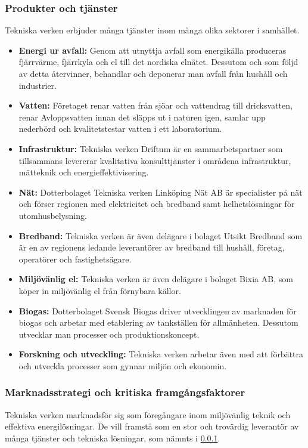 \documentclass[10pt,a4paper]{article}
\begin{document}
\subsubsection{Produkter och tjänster} \label{prod}
Tekniska verken erbjuder många tjänster inom många olika sektorer i samhället.
\begin{itemize}
	\item \textbf{Energi ur avfall:} Genom att utnyttja avfall som energikälla
	produceras fjärrvärme, fjärrkyla och el till det nordiska elnätet. Dessutom och
	som följd av detta återvinner, behandlar och deponerar man avfall från hushåll
	och industrier.
	\item \textbf{Vatten:} Företaget renar vatten från sjöar och vattendrag till
	dricksvatten, renar Avloppsvatten innan det släpps ut i naturen igen, samlar
	upp nederbörd och kvalitetstestar vatten i ett laboratorium.
	\item \textbf{Infrastruktur:} Tekniska verken Driftum är en sammarbetspartner
	som tillsammans levererar kvalitativa konsulttjänster i områdena infrastruktur,
	mätteknik och energieffektivisering.
	\item \textbf{Nät:} Dotterbolaget Tekniska verken Linköping Nät AB är
	specialister på nät och förser regionen med elektricitet och bredband samt
	helhetslösningar för utomhusbelysning.
	\item \textbf{Bredband:} Tekniska verken är även delägare i bolaget Utsikt
	Bredband som är en av regionens ledande leverantörer av bredband till hushåll,
	företag, operatörer och fastighetsägare.
	\item \textbf{Miljövänlig el:} Tekniska verken är även delägare i bolaget Bixia
	AB, som köper in miljövänlig el från förnybara källor.
	\item \textbf{Biogas:} Dotterbolaget Svensk Biogas driver utvecklingen av
	marknaden för biogas och arbetar med etablering av tankställen för allmänheten.
	Dessutom utvecklar man processer och produktionskoncept.
	\item \textbf{Forskning och utveckling:} Tekniska verken arbetar även med att
	förbättra och utveckla processer som gynnar miljön och ekonomin.
\end{itemize}

\subsubsection{Marknadsstrategi och kritiska framgångsfaktorer}
Tekniska verken marknadsför sig som föregångare inom miljövänlig teknik och
effektiva energilösningar. De vill framstå som en stor och trovärdig leverantör 
av många tjänster och tekniska lösningar, som nämnts i \ref{prod}. 
\end{document}
